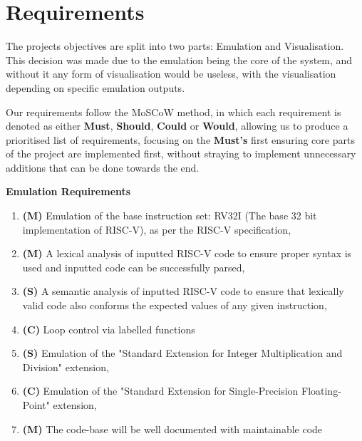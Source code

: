
\chapter{Requirements}
\label{ch:requirements}
The projects objectives are split into two parts: Emulation and Visualisation. This decision was made due to the emulation being the core of the system, and without it any form of visualisation would be useless, with the visualisation depending on specific emulation outputs.

Our requirements follow the MoSCoW method, in which each requirement is denoted as either \textbf{Must}, \textbf{Should}, \textbf{Could} or \textbf{Would}, allowing us to produce a prioritised list of requirements, focusing on the \textbf{Must's} first ensuring core parts of the project are implemented first, without straying to implement unnecessary additions that can be done towards the end.

\textbf{Emulation Requirements}
\begin{enumerate}[label={E\theenumi}]
    \item \label{req:e1} \textbf{(M)} Emulation of the base instruction set: RV32I \cite{waterman_2019_the} (The base 32 bit implementation of RISC-V), as per the RISC-V specification,
    \item \label{req:e2} \textbf{(M)} A lexical analysis of inputted RISC-V code to ensure proper syntax is used and inputted code can be successfully parsed,
    \item \label{req:e3} \textbf{(S)} A semantic analysis of inputted RISC-V code to ensure that lexically valid code also conforms the expected values of any given instruction,
    \item \label{req:e4} \textbf{(C)} Loop control via labelled functions
    \item \label{req:md} \textbf{(S)} Emulation of the "Standard Extension for Integer Multiplication and Division" extension,
    \item \label{req:fp} \textbf{(C)} Emulation of the "Standard Extension for Single-Precision Floating-Point" extension,
 
    \item \label{req:e7} \textbf{(M)} The code-base will be well documented with maintainable code
\end{enumerate}


